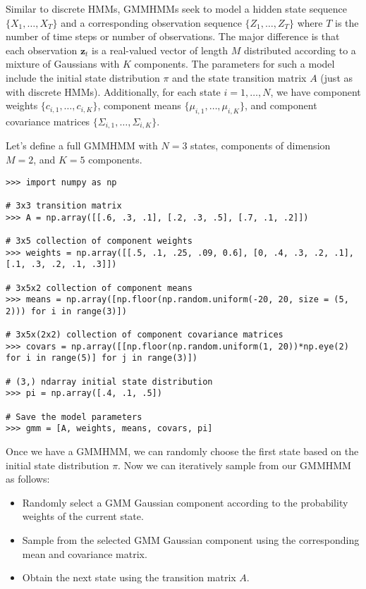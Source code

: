 Similar to discrete HMMs, GMMHMMs seek to model a hidden state sequence $\{X_1,\ldots, X_T\}$ and a corresponding observation sequence $\{Z_1,\ldots,Z_T\}$ where $T$ is the number of time steps or number of observations.
The major difference is that each observation $\mathbf{z}_t$ is a real-valued vector of length $M$ distributed according to a mixture of Gaussians with $K$ components.
The parameters for such a model include the initial state distribution $\pi$ and the state transition matrix $A$ (just as with discrete HMMs).
Additionally, for each state $i=1,\ldots,N$, we have component weights $\{c_{i,1},\ldots,c_{i,K}\}$, component means $\{\mu_{i,1},\ldots,\mu_{i,K}\}$, and component covariance matrices
$\{\Sigma_{i,1},\ldots,\Sigma_{i,K}\}$.

Let's define a full GMMHMM with $N=3$ states, components of dimension $M = 2$, and $K=5$ components.
\begin{lstlisting}
>>> import numpy as np

# 3x3 transition matrix 
>>> A = np.array([[.6, .3, .1], [.2, .3, .5], [.7, .1, .2]])

# 3x5 collection of component weights
>>> weights = np.array([[.5, .1, .25, .09, 0.6], [0, .4, .3, .2, .1], [.1, .3, .2, .1, .3]])

# 3x5x2 collection of component means
>>> means = np.array([np.floor(np.random.uniform(-20, 20, size = (5, 2))) for i in range(3)])

# 3x5x(2x2) collection of component covariance matrices       
>>> covars = np.array([[np.floor(np.random.uniform(1, 20))*np.eye(2) for i in range(5)] for j in range(3)])

# (3,) ndarray initial state distribution 
>>> pi = np.array([.4, .1, .5]) 

# Save the model parameters 
>>> gmm = [A, weights, means, covars, pi]
\end{lstlisting}

Once we have a GMMHMM, we can randomly choose the first state based on the initial state distribution $\pi$.
Now we can iteratively sample from our GMMHMM as follows:
\begin{itemize}
\item Randomly select a GMM Gaussian component according to the probability weights of the current state.
\item Sample from the selected GMM Gaussian component using the corresponding mean and covariance matrix.
\item Obtain the next state using the transition matrix $A$.
\end{itemize}

